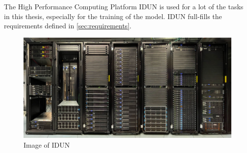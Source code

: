 The High Performance Computing Platform IDUN \cite{epic} is used for a lot of the tasks in this thesis, especially for the training of the model. IDUN full-fills the requirements defined in \cref{sec:requirements}.

\begin{figure}[htp]
    \centering
    \includegraphics[width=\textwidth]{figures/idun.jpeg}
    \caption{Image of IDUN \cite{idun2}}
    \label{fig:idun}
\end{figure}
